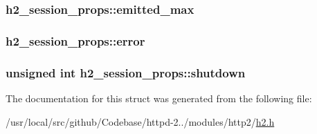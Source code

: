 \subsubsection[{\texorpdfstring{emitted\+\_\+max}{emitted_max}}]{ h2\+\_\+session\+\_\+props\+::emitted\+\_\+max}\hypertarget{structh2__session__props_a6e5057c1b5f9fa9968e3a6ee3cf517a7}{}\label{structh2__session__props_a6e5057c1b5f9fa9968e3a6ee3cf517a7}
\subsubsection[{\texorpdfstring{error}{error}}]{ h2\+\_\+session\+\_\+props\+::error}\hypertarget{structh2__session__props_a4a6f1636628be8452a28906c9a01153f}{}\label{structh2__session__props_a4a6f1636628be8452a28906c9a01153f}
\subsubsection[{\texorpdfstring{shutdown}{shutdown}}]{\setlength{\rightskip}{0pt plus 5cm}unsigned {\bf int} h2\+\_\+session\+\_\+props\+::shutdown}\hypertarget{structh2__session__props_a14a0cc8252ddce4163ab21728177d060}{}\label{structh2__session__props_a14a0cc8252ddce4163ab21728177d060}


The documentation for this struct was generated from the following file\+:\begin{DoxyCompactItemize}
\item 
/usr/local/src/github/\+Codebase/httpd-\/2../modules/http2/\hyperlink{h2_8h}{h2.\+h}\end{DoxyCompactItemize}
